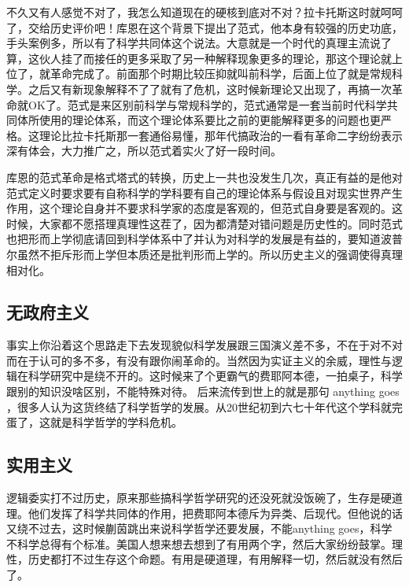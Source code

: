 \documentclass[]{tufte-book}
\begin{document}
不久又有人感觉不对了，我怎么知道现在的硬核到底对不对？拉卡托斯这时就呵呵了，交给历史评价吧！库恩在这个背景下提出了范式，他本身有较强的历史功底，手头案例多，所以有了科学共同体这个说法。大意就是一个时代的真理主流说了算，这伙人挂了而接任的更多采取了另一种解释现象更多的理论，那这个理论就上位了，就革命完成了。前面那个时期比较压抑就叫前科学，后面上位了就是常规科学。之后又有新现象解释不了了就有了危机，这时候新理论又出现了，再搞一次革命就OK了。范式是来区别前科学与常规科学的，范式通常是一套当前时代科学共同体所使用的理论体系，而这个理论体系要比之前的更能解释更多的问题也更严格。这理论比拉卡托斯那一套通俗易懂，那年代搞政治的一看有革命二字纷纷表示深有体会，大力推广之，所以范式着实火了好一段时间。

库恩的范式革命是格式塔式的转换，历史上一共也没发生几次，真正有益的是他对范式定义时要求要有自称科学的学科要有自己的理论体系与假设且对现实世界产生作用，这个理论自身并不要求科学家的态度是客观的，但范式自身要是客观的。这时候，大家都不愿搭理真理性这茬了，因为都清楚对错问题是历史性的。同时范式也把形而上学彻底请回到科学体系中了并认为对科学的发展是有益的，要知道波普尔虽然不拒斥形而上学但本质还是批判形而上学的。所以历史主义的强调使得真理相对化。

\hypertarget{ux65e0ux653fux5e9cux4e3bux4e49}{%
\subsection{无政府主义}\label{ux65e0ux653fux5e9cux4e3bux4e49}}

事实上你沿着这个思路走下去发现貌似科学发展跟三国演义差不多，不在于对不对而在于认可的多不多，有没有跟你闹革命的。当然因为实证主义的余威，理性与逻辑在科学研究中是绕不开的。这时候来了个更霸气的费耶阿本德，一拍桌子，科学跟别的知识没啥区别，不能特殊对待。 后来流传到世上的就是那句 anything goes ，很多人认为这货终结了科学哲学的发展。从20世纪初到六七十年代这个学科就完蛋了，这就是科学哲学的学科危机。

\hypertarget{ux5b9eux7528ux4e3bux4e49}{%
\subsection{实用主义}\label{ux5b9eux7528ux4e3bux4e49}}

逻辑委实打不过历史，原来那些搞科学哲学研究的还没死就没饭碗了，生存是硬道理。他们发挥了科学共同体的作用，把费耶阿本德斥为异类、后现代。但他说的话又绕不过去，这时候蒯茵跳出来说科学哲学还要发展，不能anything goes，科学不科学总得有个标准。美国人想来想去想到了有用两个字，然后大家纷纷鼓掌。理性，历史都打不过生存这个命题。有用是硬道理，有用解释一切，然后就没有然后了。
\end{document}
